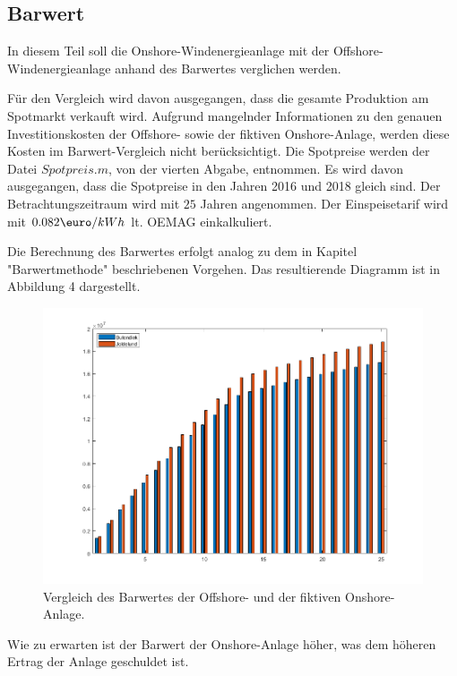 \documentclass[a4paper,12pt]{article}
\begin{document}
	\subsection{Barwert}
	In diesem Teil soll die Onshore-Windenergieanlage mit der Offshore-Windenergieanlage anhand des Barwertes verglichen werden.\\ \par
	\noindent Für den Vergleich wird davon ausgegangen, dass die gesamte Produktion am Spotmarkt verkauft wird. Aufgrund mangelnder Informationen zu den genauen Investitionskosten der Offshore- sowie der fiktiven Onshore-Anlage, werden diese Kosten im Barwert-Vergleich nicht berücksichtigt.\newline
	Die Spotpreise werden der Datei $Spotpreis.m$, von der vierten Abgabe, entnommen. Es wird davon ausgegangen, dass die Spotpreise in den Jahren 2016 und 2018 gleich sind.
	\newline Der Betrachtungszeitraum wird mit $25$ Jahren angenommen. Der Einspeisetarif wird mit $0.082\mbox{\euro}/kWh$ lt. OEMAG einkalkuliert.\\ \par
	\noindent Die Berechnung des Barwertes erfolgt analog zu dem in Kapitel "Barwertmethode" beschriebenen Vorgehen.\newline
	Das resultierende Diagramm ist in Abbildung 4 dargestellt.
	\begin{figure}[H]
		\centering
		\includegraphics[width=12cm]{img/results/BarwertOnshoreOffshore}
		\caption{Vergleich des Barwertes der Offshore- und der fiktiven Onshore-Anlage.}
	\end{figure}
	\noindent Wie zu erwarten ist der Barwert der Onshore-Anlage höher, was dem höheren Ertrag der Anlage geschuldet ist.\newline
\end{document}

